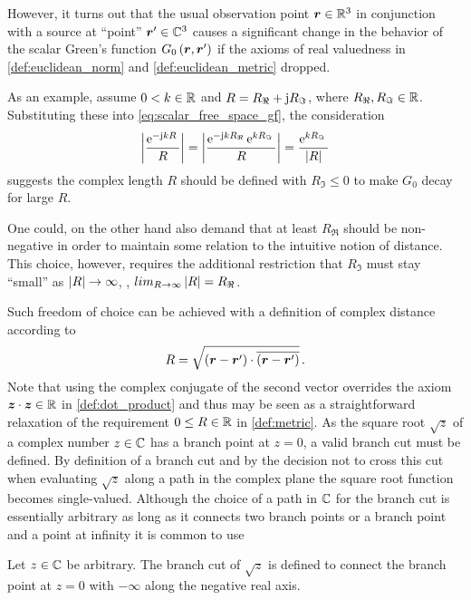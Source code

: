 However, it turns out that the usual observation point $\robs \in \R^3$ 
in conjunction with a source at \enquote{point} $\rsrc \in \C^3$
causes a significant change in the behavior of the scalar Green's function
$G_0 \left(\robs, \rsrc\right)$ if the axioms of real valuedness in
\cref{def:euclidean_norm} and \cref{def:euclidean_metric} dropped.

As an example, assume $0 < k \in \mathbb{R}$ and
$R = R_\Re + \mathrm{j} R_\Im$, where
$R_\Re, R_\Im \in \mathbb{R}$.
Substituting these into \eqref{eq:scalar_free_space_gf}, the consideration
\begin{equation}\label{eq:example_csb}
	\left\vert\frac{\mathrm{e}^{-\mathrm{j} k R}\,}{R}\right\vert = 
	\left\vert \frac{\mathrm{e}^{-\mathrm{j} k R_\Re}\, \mathrm{e}^{k R_\Im}\,}{R} \right\vert = 
	\frac{\mathrm{e}^{k R_\Im}\,}{\left\vert R\right\vert}
\end{equation}
suggests the complex length $R$ should be defined with $R_\Im \leq 0$ to
make $G_0$ decay for large $R$.

One could, on the other hand also demand that at least $R_\Re$ should be
non-negative in order to maintain some relation to the intuitive notion of
distance.
This choice, however, requires the additional restriction that $R_\Im$
must stay \enquote{small} as $\left\vert R\right\vert \to \infty$, \ie,
$lim_{R \to \infty} \left\vert R\right\vert = R_\Re$.

Such freedom of choice can be achieved with a definition of complex distance
according to
\begin{equation}\label{eq:cmplx_length_undefined}
	R = \sqrt{\left(\rdiff\right) \cdot \overline{\left(\rdiff\right)}}
	\, .
\end{equation}
Note that using the complex conjugate of the second vector overrides the
axiom $\pvec{z} \cdot \pvec{z} \in \R$ in \cref{def:dot_product} and thus
may be seen as a straightforward relaxation of the requirement
$0 \leq R \in \mathbb{R}$ in \cref{def:metric}.
As the square root $\sqrt{z}$ of a complex number $z \in \mathbb{C}$ has a branch point
at $z = 0$, a valid branch cut must be defined.
By definition of a branch cut and by the decision not to cross this cut when
evaluating $\sqrt{z}$ along a path in the complex plane the square root function
becomes single-valued.
Although the choice of a path in $\mathbb{C}$ for the branch cut is essentially
arbitrary as long as it connects two branch points or a branch point and a
point at infinity it is common to use 
\cite[104]{Olver2010}\cite[\S\S2.2.3]{Chew1999}\cite[1066]{vanBladel2007}

\begin{definition}
	\label{def:sqrt_standard_branch_cut}
	Let $z \in \mathbb{C}$ be arbitrary.
	The branch cut of $\sqrt{z}$ is defined to connect the branch point at
	$z = 0$ with $-\infty$ along the negative real axis.
\end{definition}

